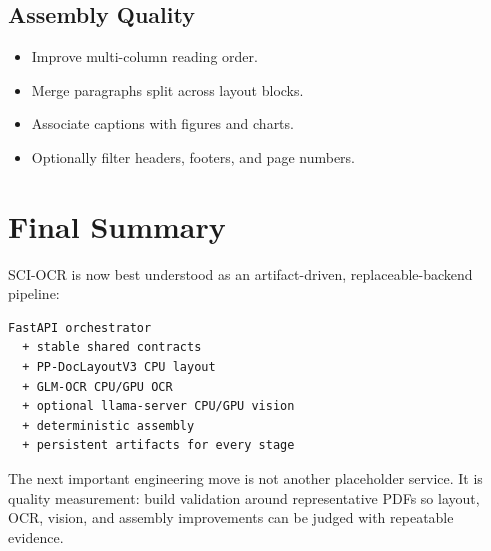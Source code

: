 \documentclass[11pt,a4paper]{article}
\begin{document}
\subsection{Assembly Quality}

\begin{itemize}[leftmargin=1.2cm]
\item Improve multi-column reading order.
\item Merge paragraphs split across layout blocks.
\item Associate captions with figures and charts.
\item Optionally filter headers, footers, and page numbers.
\end{itemize}

\section{Final Summary}

SCI-OCR is now best understood as an artifact-driven, replaceable-backend
pipeline:

\begin{lstlisting}
FastAPI orchestrator
  + stable shared contracts
  + PP-DocLayoutV3 CPU layout
  + GLM-OCR CPU/GPU OCR
  + optional llama-server CPU/GPU vision
  + deterministic assembly
  + persistent artifacts for every stage
\end{lstlisting}

The next important engineering move is not another placeholder service. It is
quality measurement: build validation around representative PDFs so layout,
OCR, vision, and assembly improvements can be judged with repeatable evidence.
\end{document}
